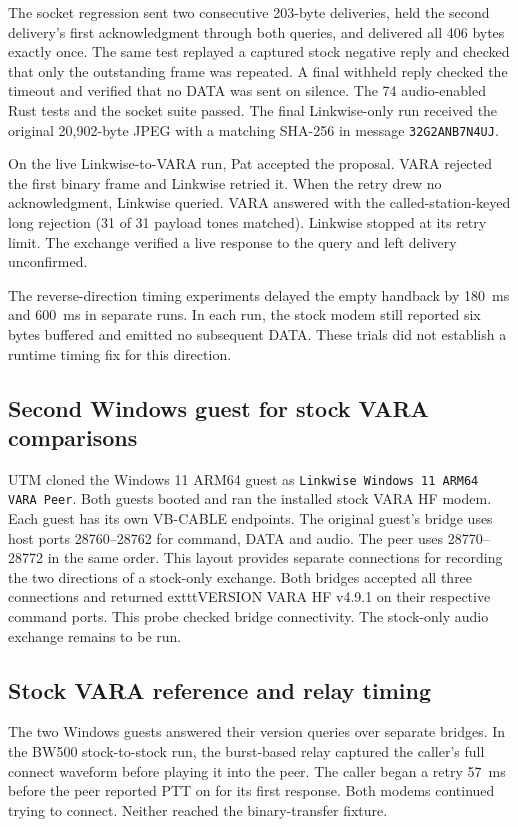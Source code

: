 \documentclass[11pt,a4paper]{article}
\begin{document}
The socket regression sent two consecutive 203-byte deliveries,
held the second delivery's first acknowledgment through both
queries, and delivered all 406 bytes exactly once. The same test
replayed a captured stock negative reply and checked that only the
outstanding frame was repeated. A final withheld reply checked the
timeout and verified that no DATA was sent on silence. The 74
audio-enabled Rust tests and the socket suite passed. The final
Linkwise-only run received the original 20,902-byte JPEG with a
matching SHA-256 in message \texttt{32G2ANB7N4UJ}.

On the live Linkwise-to-VARA run, Pat accepted the proposal. VARA
rejected the first binary frame and Linkwise retried it. When
the retry drew no acknowledgment, Linkwise queried. VARA
answered with the called-station-keyed long rejection
(31 of 31 payload tones matched). Linkwise stopped at its retry
limit. The exchange verified a live response to the query and
left delivery unconfirmed.

The reverse-direction timing experiments delayed the empty
handback by 180~ms and 600~ms in separate runs. In each run, the
stock modem still reported six bytes buffered and emitted no
subsequent DATA. These trials did not establish a runtime timing
fix for this direction.

\subsection{Second Windows guest for stock VARA comparisons}

UTM cloned the Windows 11 ARM64 guest as
\texttt{Linkwise Windows 11 ARM64 VARA Peer}. Both guests booted
and ran the installed stock VARA HF modem. Each guest has its
own VB-CABLE endpoints. The original guest's bridge uses host
ports 28760--28762 for command, DATA and audio. The peer uses
28770--28772 in the same order. This layout provides separate
connections for recording the two directions of a stock-only
exchange. Both bridges accepted all three connections and returned
	exttt{VERSION VARA HF v4.9.1} on their respective command ports.
This probe checked bridge connectivity. The stock-only audio
exchange remains to be run.

\subsection{Stock VARA reference and relay timing}

The two Windows guests answered their version queries over
separate bridges. In the BW500 stock-to-stock run, the
burst-based relay captured the caller's full connect waveform
before playing it into the peer. The caller began a retry
57~ms before the peer reported PTT on for its first response.
Both modems continued trying to connect. Neither reached the
binary-transfer fixture.
\end{document}
